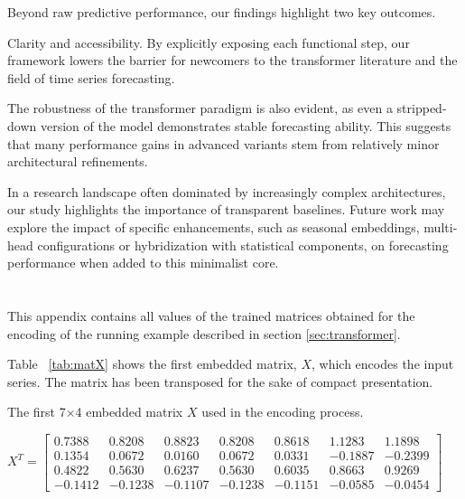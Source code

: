 \documentclass[algorithms,article,submit,pdftex,moreauthors]{Definitions/mdpi}
\begin{document}
Beyond raw predictive performance, our findings highlight two key outcomes.

Clarity and accessibility. By explicitly exposing each functional step, our framework lowers the barrier for newcomers to the transformer literature and the field of time series forecasting.

The robustness of the transformer paradigm is also evident, as even a stripped-down version of the model demonstrates stable forecasting ability. This suggests that many performance gains in advanced variants stem from relatively minor architectural refinements.

In a research landscape often dominated by increasingly complex architectures, our study highlights the importance of transparent baselines. Future work may explore the impact of specific enhancements, such as seasonal embeddings, multi-head configurations or hybridization with statistical components, on forecasting performance when added to this minimalist core.

\appendixstart
\appendix
\section[\appendixname~\thesection]{} \label{sec:appendix}
This appendix contains all values of the trained matrices obtained for the encoding of the running example described in section \ref{sec:transformer}.

\noindent Table ~\ref{tab:matX} shows the first embedded matrix, $X$, which encodes the input series. The matrix has been transposed for the sake of compact presentation.

\begin{table}[ht]
	\centering
	\caption{The first 7$\times$4 embedded matrix $X$ used in the encoding process.}
	\label{tab:matX}
	$
	X^T =	\begin{bmatrix}
			0.7388 & 0.8208 & 0.8823 & 0.8208 & 0.8618 & 1.1283 & 1.1898 \\
			0.1354 & 0.0672 & 0.0160 & 0.0672 & 0.0331 & -0.1887 & -0.2399 \\
			0.4822 & 0.5630 & 0.6237 & 0.5630 & 0.6035 & 0.8663 & 0.9269 \\
			-0.1412 & -0.1238 & -0.1107 & -0.1238 & -0.1151 & -0.0585 & -0.0454
		\end{bmatrix}
	$
\end{table}
\end{document}
